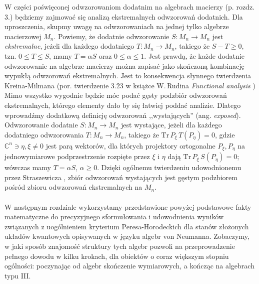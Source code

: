 W części poświęconej odwzorowaniom dodatnim na algebrach macierzy (p. rozdz. 3.)
będziemy zajmować się analizą ekstremalnych odwzorowań dodatnich.
Dla uproszczenia,
skupmy uwagę na odwzorowaniach na jednej tylko algebrze macierzowej $M_{n}$.
Powiemy, że dodatnie odwzorowanie $S: M_{n} \rightarrow M_{n}$ jest \emph{ekstremalne},
jeżeli dla każdego dodatniego $T: M_{n} \rightarrow M_{n}$, takiego że
$S - T \geq 0$, tzn. $0 \leq T \leq S$,
mamy $T = \alpha S$ oraz $0 \leq \alpha \leq 1$.
Jest prawdą, że każde dodatnie odwzorowanie na algebrze macierzy można zapisać
jako skończoną kombinację wypukłą odwzorowań ekstremalnych.
Jest to konsekwencja słynnego twierdzenia Kreina-Milmana
(por. twierdzenie 3.23 w książce W.\,Rudina \emph{Functional analysis}
\cite{Rudin1991})
Mimo wszystko wygodnie będzie móc podać gęsty podzbiór odwzorowań ekstremalnych,
którego elementy dało by się łatwiej poddać analizie.
Dlatego wprowadźmy dodatkową definicję odwzorowań ,,wystających''
(ang. \emph{exposed}).
Odwzorowanie dodatnie $S: M_{n} \rightarrow M_{n}$ jest wystające,
jeżeli dla każdego dodatniego odwzorowania $T: M_{n} \rightarrow M_{n}$,
takiego że $\text{Tr}\, P_{\xi} \, T(P_{\eta}) = 0$,
gdzie $\mathbb{C}^{n} \ni \eta, \xi \neq 0$ jest parą wektorów,
dla których projektory ortogonalne $P_{\xi}, P_{\eta}$ na jednowymiarowe
podprzestrzenie rozpięte przez $\xi$ i $\eta$ dają
$\text{Tr}\, P_{\xi} \, S(P_{\eta}) = 0$;
wówczas mamy $T = \alpha S$, $\alpha \geq 0$.
Dzięki ogólnemu twierdzeniu udowodnionemu przez Straszewicza
\cite{straszewicz1935exponierte},
zbiór odwzorowań wystających jest gęstym podzbiorem pośród zbioru odwzorowań
ekstremalnych na $M_{n}$.

\paragraph{}
W następnym rozdziale wykorzystamy przedstawione powyżej podstawowe fakty
matematyczne do precyzyjnego sformułowania i udowodnienia wyników związanych
z uogólnieniem kryterium Peresa-Horodeckich dla stanów złożonych układów
kwantowych opisywanych w języku algebr von Neumanna.
Zobaczymy,
w jaki sposób znajomość struktury tych algebr pozwoli na przeprowadzenie
pełnego dowodu w kilku krokach, dla obiektów o coraz większym stopniu ogólności:
poczynając od algebr skończenie wymiarowych,
a kończąc na algebrach typu III.
